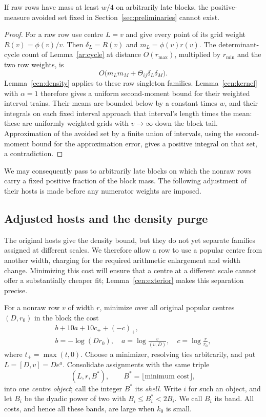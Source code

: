 \begin{lemma}
\label{cen:raw}
If raw rows have mass at least $w/4$ on arbitrarily late blocks, the
positive-measure avoided set fixed in Section~\ref{sec:preliminaries}
cannot exist.
\end{lemma}

\begin{proof}
For a raw row use centre $L=v$ and give every point of its grid weight
$R(v)=\phi(v)/v$. Then $\delta_L=R(v)$ and $m_L=\phi(v)r(v)$.
The determinant-cycle count of Lemma~\ref{ar:cycle} at distance
$O(r_{\max})$, multiplied by
$r_{\min}$ and the two row weights, is
\[
 O\bigl(m_Lm_M+\Theta_{ij}\delta_L\delta_M\bigr).
\]
Lemma~\ref{cen:density} applies to these raw singleton families.
Lemma~\ref{cen:kernel} with $\alpha=1$ therefore gives a uniform
second-moment bound for their weighted interval trains. Their means
are bounded below by a constant times $w$, and their integrals on each
fixed interval approach that interval's length times the mean: these
are uniformly weighted grids with $v\to\infty$ down the block tail.
Approximation of the avoided set by a finite union of intervals, using
the second-moment bound for the approximation error, gives a positive
integral on that set, a contradiction.
\end{proof}

We may consequently pass to arbitrarily late blocks on which the
nonraw rows carry a fixed positive fraction of the block mass. The
following adjustment of their hosts is made before any numerator
weights are imposed.

\subsection{Adjusted hosts and the density purge}

The original hosts give the density bound, but they do not yet separate
families assigned at different scales. We therefore allow a row to use a
popular centre from another width, charging for the required arithmetic
enlargement and width change. Minimizing this cost will ensure that a
centre at a different scale cannot offer a substantially cheaper fit;
Lemma~\ref{cen:exterior} makes this separation precise.

For a nonraw row $v$ of width $r$, minimize over all original popular
centres $(D,r_0)$ in the block the cost
\begin{equation}
 \begin{gathered}
 b+10a+10c_++(-c)_+,\\
 b=-\log(Dr_0),\quad
 a=\log\frac{v}{(v,D)},\quad c=\log\frac r{r_0},
 \end{gathered}
 \label{cen:assignment-cost}
\end{equation}
where $t_+=\max(t,0)$. Choose a minimizer, resolving ties
arbitrarily, and put $L=[D,v]=De^a$. Consolidate assignments with the
same triple
\[
 (L,r,B^*),\qquad B^*=\lfloor\text{minimum cost}\rfloor,
\]
into one \emph{centre object}; call the integer $B^*$ its \emph{shell}.
Write $i$ for such an object, and let
$B_i$ be the dyadic power of two with $B_i\le B_i^*<2B_i$.
We call $B_i$ its band. All costs, and hence all these bands, are large
when $k_0$ is small.

